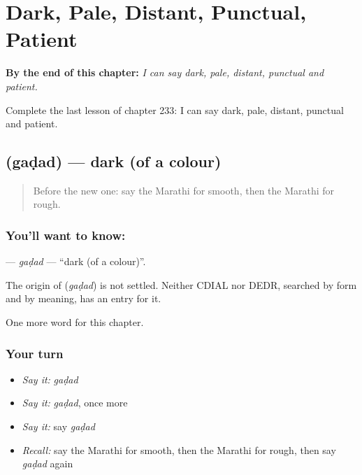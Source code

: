 
\chapter{Dark, Pale, Distant, Punctual, Patient}
\label{ch:mr-dark-pale-distant-punctual-patient}

\begin{chapteropening}
\textbf{By the end of this chapter:} \emph{I can say dark, pale, distant, punctual and patient.}

Complete the last lesson of chapter 233: I can say dark, pale, distant, punctual and patient.
\end{chapteropening}

\section[\texorpdfstring{\mr{गडद} (gaḍad)}{गडद (gaḍad)}]{ (gaḍad) — dark (of a colour)}

\label{lesson:MR-C233-gadad}



\begin{quote}
Before the new one: say the Marathi for smooth, then the Marathi for rough.
\end{quote}

\subsection*{You'll want to know: }
\textbf{} — \emph{gaḍad} — \textquotedblleft{}dark (of a colour)\textquotedblright{}.

\begin{cousinweb}
The origin of \textbf{} (\emph{gaḍad}) is not settled. Neither CDIAL nor DEDR, searched by form and by meaning, has an entry for it.
\end{cousinweb}

\begin{grammarlens}[title={What you've built}]
One more word for this chapter.
\end{grammarlens}

\subsection*{Your turn}
\begin{itemize}
\raggedright
  \item \emph{Say it:} \emph{gaḍad}
  \item \emph{Say it:} \emph{gaḍad}, once more
  \item \emph{Say it:} say \emph{gaḍad}
  \item \emph{Recall:} say the Marathi for smooth, then the Marathi for rough, then say \emph{gaḍad} again
\end{itemize}

